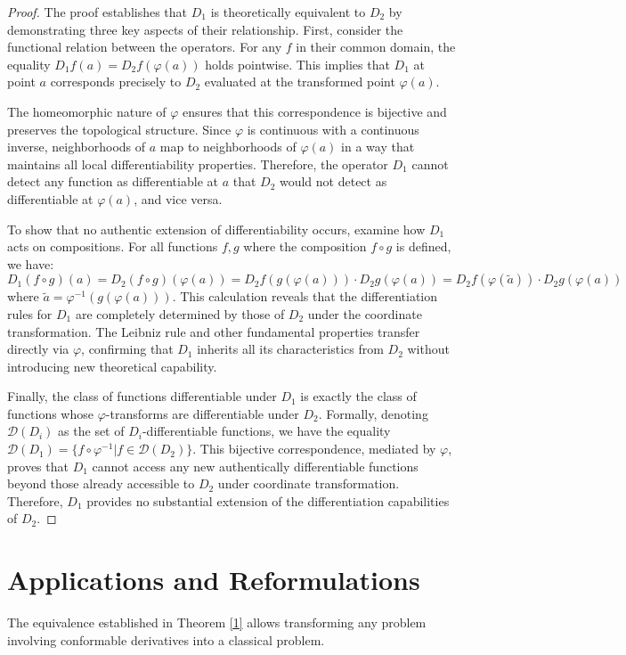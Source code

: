 \documentclass[preprint,12pt]{elsarticle}
\newtheorem{proof}{Proof}
\begin{document}
\begin{proof} The proof establishes that $D_1$ is theoretically equivalent to $D_2$ by demonstrating three key aspects of their relationship. First, consider the functional relation between the operators. For any $f$ in their common domain, the equality $D_1 f(a) = D_2 f(\varphi(a))$ holds pointwise. This implies that $D_1$ at point $a$ corresponds precisely to $D_2$ evaluated at the transformed point $\varphi(a)$.

The homeomorphic nature of $\varphi$ ensures that this correspondence is bijective and preserves the topological structure. Since $\varphi$ is continuous with a continuous inverse, neighborhoods of $a$ map to neighborhoods of $\varphi(a)$ in a way that maintains all local differentiability properties. Therefore, the operator $D_1$ cannot detect any function as differentiable at $a$ that $D_2$ would not detect as differentiable at $\varphi(a)$, and vice versa.

To show that no authentic extension of differentiability occurs, examine how $D_1$ acts on compositions. For all functions $f,g$ where the composition $f \circ g$ is defined, we have:
\[
D_1(f \circ g)(a) = D_2(f \circ g)(\varphi(a)) = D_2 f(g(\varphi(a))) \cdot D_2 g(\varphi(a)) = D_2 f(\varphi(\tilde{a})) \cdot D_2 g(\varphi(a))
\]
where $\tilde{a} = \varphi^{-1}(g(\varphi(a)))$. This calculation reveals that the differentiation rules for $D_1$ are completely determined by those of $D_2$ under the coordinate transformation. The Leibniz rule and other fundamental properties transfer directly via $\varphi$, confirming that $D_1$ inherits all its characteristics from $D_2$ without introducing new theoretical capability.

Finally, the class of functions differentiable under $D_1$ is exactly the class of functions whose $\varphi$-transforms are differentiable under $D_2$. Formally, denoting $\mathcal{D}(D_i)$ as the set of $D_i$-differentiable functions, we have the equality $\mathcal{D}(D_1) = \{ f \circ \varphi^{-1} | f \in \mathcal{D}(D_2) \}$. This bijective correspondence, mediated by $\varphi$, proves that $D_1$ cannot access any new authentically differentiable functions beyond those already accessible to $D_2$ under coordinate transformation. Therefore, $D_1$ provides no substantial extension of the differentiation capabilities of $D_2$.
\end{proof}




\section{Applications and Reformulations}
The equivalence established in Theorem \ref{1} allows transforming any problem involving conformable derivatives into a classical problem.
\end{document}
